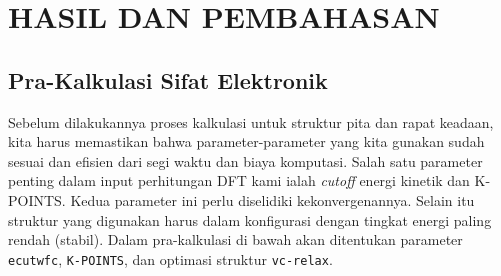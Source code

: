 \renewcommand{\thechapter}{\Roman{chapter}}
\chapter{HASIL DAN PEMBAHASAN}
\renewcommand{\thechapter}{\arabic{chapter}}

\section{Pra-Kalkulasi Sifat Elektronik}
Sebelum dilakukannya proses kalkulasi untuk struktur pita dan rapat keadaan, kita harus memastikan bahwa parameter-parameter yang kita gunakan sudah sesuai dan efisien dari segi waktu dan biaya komputasi. Salah satu parameter penting dalam input perhitungan DFT kami ialah \textit{cutoff} energi kinetik dan K-POINTS. Kedua parameter ini perlu diselidiki kekonvergenannya. Selain itu struktur yang digunakan harus dalam konfigurasi dengan tingkat energi paling rendah (stabil). Dalam pra-kalkulasi di bawah akan ditentukan parameter \texttt{ecutwfc}, \texttt{K-POINTS}, dan optimasi struktur \texttt{vc-relax}.\nocite{Giannozzi_2017}\nocite{giannozzi2020quantum}

